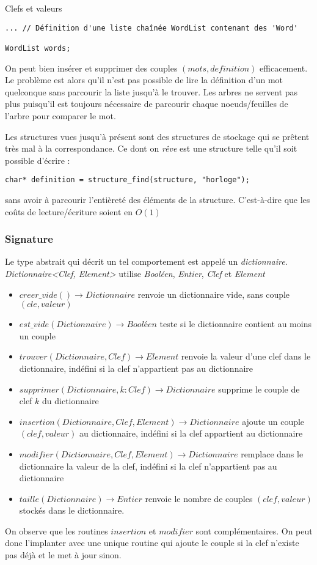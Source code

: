 \documentclass[../../../main.tex]{subfiles}
\begin{document}
\begin{definition}{Clefs et valeurs}
\begin{verbatim}
... // Définition d'une liste chaînée WordList contenant des 'Word'

WordList words;
\end{verbatim}
On peut bien insérer et supprimer des couples $(mots, definition)$ efficacement. Le problème est alors qu'il n'est pas possible de lire la définition d'un mot quelconque sans parcourir la liste jusqu'à le trouver. Les arbres ne servent pas plus puisqu'il est toujours nécessaire de parcourir chaque noeuds/feuilles de l'arbre pour comparer le mot.

Les structures vues jusqu'à présent sont des structures de stockage qui se prêtent très mal à la correspondance. Ce dont on \textit{rêve} est une structure telle qu'il soit possible d'écrire :
\begin{verbatim}
char* definition = structure_find(structure, "horloge");
\end{verbatim}
sans avoir à parcourir l'entièreté des éléments de la structure. C'est-à-dire que les coûts de lecture/écriture soient en $O(1)$
\subsubsection{Signature}
Le type abstrait qui décrit un tel comportement est appelé un \textit{dictionnaire}. \newline
\textit{Dictionnaire\textless Clef, Element\textgreater} utilise \textit{Booléen}, \textit{Entier}, \textit{Clef} et \textit{Element}
\begin{itemize}
	\item $creer\_vide()\rightarrow Dictionnaire$ renvoie un dictionnaire vide, sans couple $(cle, valeur)$
	\item $est\_vide(Dictionnaire)\rightarrow \textit{Booléen}$ teste si le dictionnaire contient au moins un couple
	\item $trouver(Dictionnaire, Clef)\rightarrow Element$ renvoie la valeur d'une clef dans le dictionnaire, indéfini si la clef n'appartient pas au dictionnaire
	\item $supprimer(Dictionnaire, k:Clef)\rightarrow Dictionnaire$ supprime le couple de clef $k$ du dictionnaire
	\item $insertion(Dictionnaire, Clef, Element)\rightarrow Dictionnaire$ ajoute un couple $(clef, valeur)$ au dictionnaire, indéfini si la clef appartient au dictionnaire
	\item $modifier(Dictionnaire, Clef, Element)\rightarrow Dictionnaire$ remplace dans le dictionnaire la valeur de la clef, indéfini si la clef n'appartient pas au dictionnaire
	\item $taille(Dictionnaire)\rightarrow Entier$ renvoie le nombre de couples $(clef, valeur)$ stockés dans le dictionnaire.
\end{itemize}
On observe que les routines $insertion$ et $modifier$ sont complémentaires. On peut donc l'implanter avec une unique routine qui ajoute le couple si la clef n'existe pas déjà et le met à jour sinon.


\end{definition}
\end{document}
